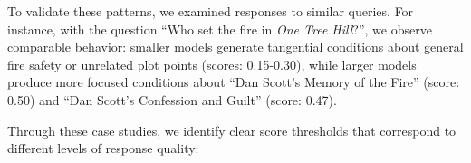 

To validate these patterns, we examined responses to similar queries. For instance, with the question ``Who set the fire in \textit{One Tree Hill}?'', we observe comparable behavior: smaller models generate tangential conditions about general fire safety or unrelated plot points (scores: 0.15-0.30), while larger models produce more focused conditions about ``Dan Scott's Memory of the Fire'' (score: 0.50) and ``Dan Scott's Confession and Guilt'' (score: 0.47).

Through these case studies, we identify clear score thresholds that correspond to different levels of response quality:


